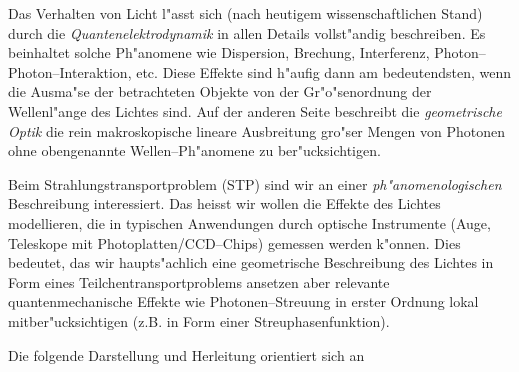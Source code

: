 \documentclass[11pt,a4paper,DIVcalc,BCOR8mm,titlepage,twoside]{scrartcl}
\begin{document}
	Das Verhalten von Licht l"asst sich (nach heutigem wissenschaftlichen Stand) durch die {\em Quantenelektrodynamik} in allen Details vollst"andig beschreiben. Es beinhaltet solche Ph"anomene wie Dispersion, Brechung, Interferenz, Photon--Photon--Interaktion, etc. Diese Effekte sind h"aufig dann am bedeutendsten, wenn die Ausma"se der betrachteten Objekte von der Gr"o"senordnung der Wellenl"ange des Lichtes sind. Auf der anderen Seite beschreibt die {\em geometrische Optik} die rein makroskopische lineare Ausbreitung gro"ser Mengen von Photonen ohne obengenannte Wellen--Ph"anomene zu ber"ucksichtigen.
	
	Beim Strahlungstransportproblem (STP) sind wir an einer {\em ph"anomenologischen} Beschreibung interessiert. Das heisst wir wollen die Effekte des Lichtes modellieren, die in typischen Anwendungen durch optische Instrumente (Auge, Teleskope mit Photoplatten/CCD--Chips) gemessen werden k"onnen. Dies bedeutet, das wir haupts"achlich eine geometrische Beschreibung des Lichtes in Form eines Teilchentransportproblems ansetzen aber relevante quantenmechanische Effekte wie Photonen--Streuung in erster Ordnung lokal mitber"ucksichtigen (z.B. in Form einer Streuphasenfunktion).
	
	Die folgende Darstellung und Herleitung orientiert sich an \citep{Arvo:1993p9035}
	
\end{document}
